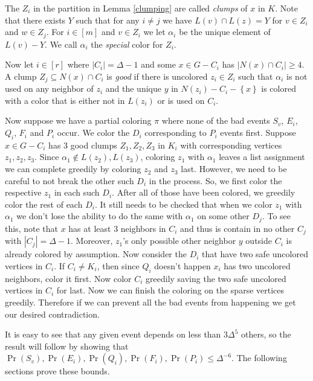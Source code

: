\documentclass[12pt]{article}
\theoremstyle{plain}
\theoremstyle{definition}
\theoremstyle{remark}
\newcommand{\set}[1]{\left\{ #1 \right\}}
\newcommand{\card}[1]{\left|#1\right|}
\newcommand{\irange}[1]{\left[#1\right]}
\begin{document}
The $Z_i$ in the partition in Lemma \ref{clumping} are called \emph{clumps} of $x$ in $K$.
Note that there exists $Y$ such that for any $i \neq j$ we have $L(v) \cap L(z)
= Y$ for $v \in Z_i$ and $w \in Z_j$.  For $i \in \irange{m}$ and $v \in Z_i$ we
let $\alpha_i$ be the unique element of $L(v) - Y$.  We call $\alpha_i$ the
\emph{special} color for $Z_i$.

Now let $i \in \irange{r}$ where $\card{C_i} = \Delta - 1$ and some $x \in G -
C_i$ has $\card{N(x) \cap C_i} \geq 4$. A clump $Z_j \subseteq
N(x) \cap C_i$ is \emph{good} if there is uncolored $z_i \in Z_i$ such that
$\alpha_i$ is not used on any neighbor of $z_i$ and the unique $y$ in $N(z_i) - C_i - \set{x}$ is colored with a color that is
either not in $L(z_i)$ or is used on $C_i$.

Now suppose we have a partial coloring $\pi$ where none of the bad events $S_v$,
$E_i$, $Q_i$, $F_i$ and $P_i$ occur.  We color the $D_i$ corresponding to $P_i$
events first.  Suppose $x \in G - C_i$ has $3$ good clumps $Z_1, Z_2, Z_3$ in $K_i$ with
corresponding vertices $z_1, z_2, z_3$.  Since $\alpha_1 \not \in L(z_2),
L(z_3)$, coloring $z_1$ with $\alpha_1$ leaves a list assignment we can complete
greedily by coloring $z_2$ and $z_3$ last.  However, we need to be careful
to not break the other such $D_i$ in the process.  So, we first color the
respective $z_1$ in each such $D_i$.  After all of those have been colored, we
greedily color the rest of each $D_i$.  
It still needs to be checked that when we color $z_1$ with $\alpha_1$ we don't lose the ability to do the same 
with $\alpha_1$ on some other $D_j$. To see this, note that $x$ has at least $3$ neighbors in $C_i$ and thus is 
contain in no other $C_j$ with $\card{C_j} = \Delta-1$.  Moreover, $z_1$'s only
possible other neighbor $y$ outside $C_i$ is already colored by assumption. 
Now consider the $D_i$ that have two safe uncolored vertices in $C_i$.  If $C_i
\neq K_i$, then since $Q_i$ doesn't happen $x_i$ has two uncolored neighbors,
color it first.  Now color $C_i$ greedily saving the two safe uncolored vertices
in $C_i$ for last. Now we can finish the coloring on the sparse vertices greedily. 
Therefore if we can prevent all the bad events from happening we get our desired contradiction.

It is easy to see that any given event depends on less than $3\Delta^5$ others,
so the result will follow by showing that $\Pr(S_v), \Pr(E_i), \Pr(Q_i),
\Pr(F_i),\Pr(P_i) \leq \Delta^{-6}$.  The following sections prove these bounds.
\end{document}
